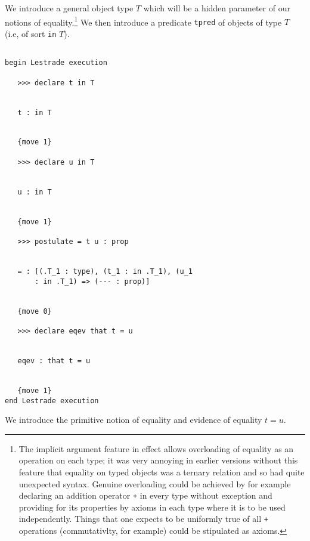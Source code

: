 \documentclass[12pt]{article}
\begin{document}
We introduce a general object type $T$ which will be a hidden parameter of our notions of equality.\footnote{The implicit argument feature in effect allows overloading of equality as an operation on each type;  it was very annoying in earlier versions without this feature that equality on typed objects was a ternary relation and so had quite unexpected syntax.  Genuine overloading could be achieved by for example declaring an addition operator {\tt +} in every type without exception and providing for its properties by axioms in each type where it is to be used independently.  Things that one expects to be uniformly true of all {\tt +} operations (commutativlty, for example) could be stipulated as axioms.}  We then introduce  a predicate {\tt tpred} of objects of type $T$ (i.e, of sort {\tt in} $T$).  

\begin{verbatim}

begin Lestrade execution

   >>> declare t in T


   t : in T


   {move 1}

   >>> declare u in T


   u : in T


   {move 1}

   >>> postulate = t u : prop


   = : [(.T_1 : type), (t_1 : in .T_1), (u_1 
       : in .T_1) => (--- : prop)]


   {move 0}

   >>> declare eqev that t = u


   eqev : that t = u


   {move 1}
end Lestrade execution
\end{verbatim}

We introduce the primitive notion of equality and evidence of equality $t=u$.
\end{document}
